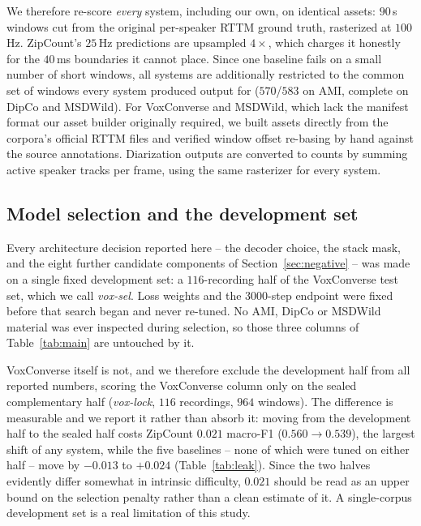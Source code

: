\documentclass[journal]{IEEEtran}
\newcommand{\sys}{ZipCount}
\begin{document}
We therefore re-score \emph{every} system, including our own, on identical
assets: $90$\,s windows cut from the original per-speaker RTTM ground truth,
rasterized at $100$\,Hz. \sys{}'s $25$\,Hz predictions are upsampled
$4\times$, which charges it honestly for the $40$\,ms boundaries it cannot
place. Since one baseline fails on a small number of short windows, all
systems are additionally restricted to the common set of windows every
system produced output for ($570$/$583$ on AMI, complete on DipCo and
MSDWild). For VoxConverse and MSDWild, which lack the manifest format our
asset builder originally required, we built assets directly from the
corpora's official RTTM files and verified window offset re-basing by hand
against the source annotations. Diarization outputs are converted to counts
by summing active speaker tracks per frame, using the same rasterizer for
every system.

\subsection{Model selection and the development set}
\label{sec:selection}
Every architecture decision reported here -- the decoder choice, the stack
mask, and the eight further candidate components of
Section~\ref{sec:negative} -- was made on a single fixed development set: a
$116$-recording half of the VoxConverse test set, which we call
\emph{vox-sel}. Loss weights and the $3000$-step endpoint were fixed before
that search began and never re-tuned. No AMI, DipCo or MSDWild material was
ever inspected during selection, so those three columns of
Table~\ref{tab:main} are untouched by it.

VoxConverse itself is not, and we therefore exclude the development half
from all reported numbers, scoring the VoxConverse column only on the sealed
complementary half (\emph{vox-lock}, $116$ recordings, $964$ windows). The
difference is measurable and we report it rather than absorb it: moving from
the development half to the sealed half costs \sys{} $0.021$ macro-F1
($0.560\!\rightarrow\!0.539$), the largest shift of any system, while the
five baselines -- none of which were tuned on either half -- move by
$-0.013$ to $+0.024$ (Table~\ref{tab:leak}). Since the two halves evidently
differ somewhat in intrinsic difficulty, $0.021$ should be read as an upper
bound on the selection penalty rather than a clean estimate of it. A
single-corpus development set is a real limitation of this study.
\end{document}
